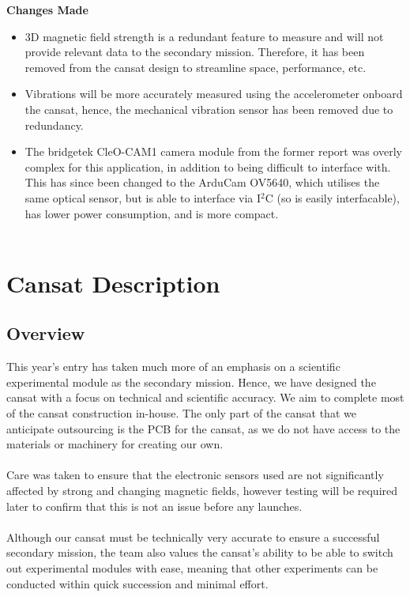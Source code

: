 \documentclass{report}
\begin{document}
		{\color{blue} \textbf{Changes Made}
		\begin{itemize}
			\item 3D magnetic field strength is a redundant feature to measure
			and will not provide relevant data to the secondary mission. Therefore,
			it has been removed from the cansat design to streamline space, 
			performance, etc.
			\item Vibrations will be more accurately measured using the 
			accelerometer onboard the cansat, hence, the mechanical vibration
			sensor has been removed due to redundancy.
			\item The bridgetek CleO-CAM1 camera module from the former 
			report was overly complex for this application, in addition to being
			difficult to interface with. This has since been changed to the ArduCam
			OV5640, which utilises the same optical sensor, but is able to interface
			via I$^2$C (so is easily interfacable), has lower power consumption, and
			is more compact.\\\\
		\end{itemize}
		}
		


\chapter{Cansat Description}
	\section{Overview}
		This year's entry has taken much more of an emphasis on a scientific
		experimental module as the secondary mission. Hence, we have designed 
		the cansat with a focus on technical and scientific accuracy. We aim to
		complete most of the cansat construction in-house. The only part of the
		cansat that we anticipate outsourcing is the PCB for the cansat, as we do
		not have access to the materials or machinery for creating our own.
		\\\\
		Care was taken to ensure that the electronic sensors used are not 
		significantly affected by strong and changing magnetic fields, however 
		testing will be required later to confirm that this is not an issue before 
		any launches.
		\\\\
		{\color{blue}Although our cansat must be technically very accurate to ensure
		a successful secondary mission, the team also values the cansat's ability
		to be able to switch out experimental modules with ease, meaning that
		other experiments can be conducted within quick succession and minimal
		effort.}
\end{document}
